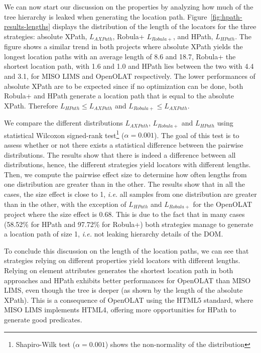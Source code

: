 We can now start our discussion on the properties by analyzing how much of the tree hierarchy is leaked when generating the location path. Figure~\ref{fig:hpath-results-lengths} displays the distribution of the length of the locators for the three strategies: absolute XPath, $L_{AXPath}$, Robula+ $L_{Robula+}$, and HPath, $L_{HPath}$. The figure shows a similar trend in both projects where absolute XPath yields the longest location paths with an average length of 8.6 and 18.7, Robula+ the shortest location path, with 1.6 and 1.0 and HPath lies between the two with 4.4 and 3.1, for MISO LIMS and OpenOLAT respectively. The lower performances of absolute XPath are to be expected since if no optimization can be done, both Robula+ and HPath generate a location path that is equal to the absolute XPath. Therefore $L_{HPath} \leq L_{AXPath}$ and $L_{Robula+} \leq L_{AXPath}$.

We compare the different distributions $L_{AXPath}$, $L_{Robula+}$ and $L_{HPath}$ using statistical Wilcoxon signed-rank test\footnote{Shapiro-Wilk test ($\alpha=0.001$) shows the non-normality of the distribution} ($\alpha=0.001$). The goal of this test is to assess whether or not there exists a statistical difference between the pairwise distributions. The results show that there is indeed a difference between all distributions, hence, the different strategies yield locators with different lengths. Then, we compute the pairwise effect size to determine how often lengths from one distribution are greater than in the other. The results show that in all the cases, the size effect is close to 1, \emph{i.e.} all samples from one distribution are greater than in the other, with the exception of $L_{HPath}$ and $L_{Robula+}$ for the OpenOLAT project where the size effect is 0.68. This is due to the fact that in many cases (58.52\% for HPath and 97.72\% for Robula+) both strategies manage to generate a location path of size 1, \emph{i.e.} not leaking hierarchy details of the DOM.

To conclude this discussion on the length of the location paths, we can see that strategies relying on different properties yield locators with different lengths. Relying on element attributes generates the shortest location path in both approaches and HPath exhibits better performances for OpenOLAT than MISO LIMS, even though the tree is deeper (as shown by the length of the absolute XPath). This is a consequence of OpenOLAT using the HTML5 standard, where MISO LIMS implements HTML4, offering more opportunities for HPath to generate good predicates.

